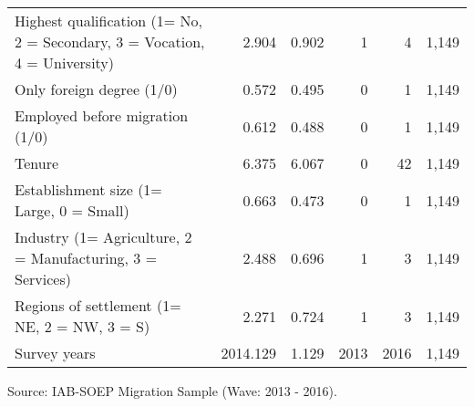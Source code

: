 \documentclass[12pt,a4paper]{article}
\begin{document}
\begin{center}
\begin{table}[htbp]
{\begin{tabular}{lrrrrr}
    \multicolumn{1}{p{21.85em}}{Highest qualification (1= No, 2 = Secondary, 3 = Vocation, 4 = University)} & 2.904 & 0.902 & 1     & 4     & 1,149 \\
    Only foreign degree (1/0) & 0.572 & 0.495 & 0     & 1     & 1,149 \\
    Employed before migration (1/0) & 0.612 & 0.488 & 0     & 1     & 1,149 \\
    Tenure & 6.375 & 6.067 & 0     & 42    & 1,149 \\
    Establishment size (1= Large, 0 = Small) & 0.663 & 0.473 & 0     & 1     & 1,149 \\
    \multicolumn{1}{p{21.85em}}{Industry (1= Agriculture, 2 = Manufacturing, 3 = Services)} & 2.488 & 0.696 & 1     & 3     & 1,149 \\
    \multicolumn{1}{p{21.85em}}{Regions of settlement (1= NE, 2 = NW, 3 = S)} & 2.271 & 0.724 & 1     & 3     & 1,149 \\
    Survey years & 2014.129 & 1.129 & 2013  & 2016  & 1,149 \\
    \bottomrule
    \end{tabular}%
 }
 \begin{tablenotes}
      \small
      \item Source: IAB-SOEP Migration Sample (Wave: 2013 - 2016).
    \end{tablenotes}
\end{table}%
\end{center}
\end{document}
